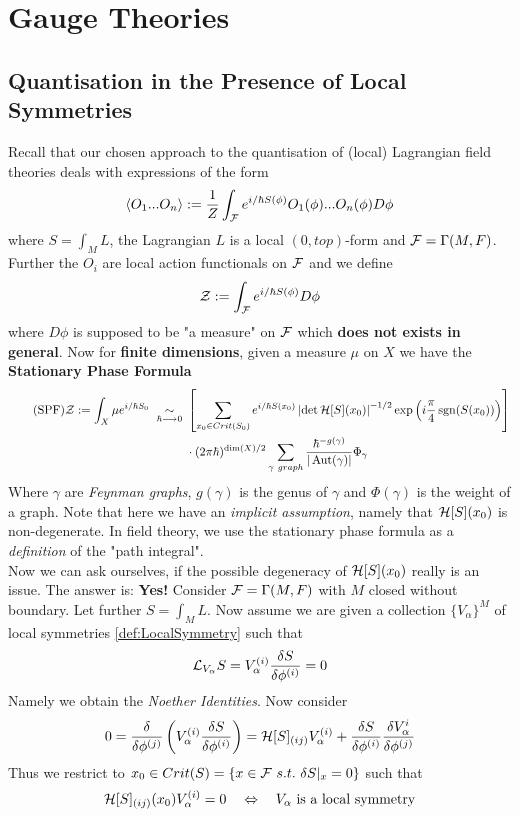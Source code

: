 \section{Gauge Theories}
\label{sec:Gauge_Theories}

\subsection{Quantisation in the Presence of Local Symmetries}

Recall that our chosen approach to the quantisation of (local) Lagrangian field theories deals with expressions of the form
$$ \langle O_1 ... O_n \rangle := \frac{1}{Z} \int_\FF e^{i/\hbar S(\phi)} O_1(\phi) ... O_n(\phi) D\phi $$
where $S = \int_M L$, the Lagrangian $L$ is a local $(0,top)$-form and ${\mathcal{F}} = \Gamma(M, F)$. Further the $O_i$ are local action functionals on ${\mathcal{F}}$ and we define
$$ \ZF := \int_\FF e^{i/\hbar S(\phi)} D\phi $$
where $D\phi$ is supposed to be "a measure" on ${\mathcal{F}}$ which \textbf{does not exists in general}. Now for \textbf{finite dimensions}, given a measure $\mu$ on $X$ we have the \textbf{Stationary Phase Formula}
\begin{align}\label{eq:StatPhase}\tag{SPF}
  \ZF := \int_X \mu e^{i/\hbar S_0} \ \underset{\hbar \lra 0}{\sim} \ &\left[ \sum_{x_0 \in Crit(S_0)} e^{i/\hbar S(x_0)} \left|\det\HH[S](x_0)\right|^{-1/2} \exp\left(i \frac{\pi}{4} \sgn(S(x_0))\right) \right]\\
   &\cdot (2\pi \hbar)^{\dim(X)/2} \sum_{\gamma \ graph} \frac{\hbar^{-g(\gamma)}}{|\Aut(\gamma)|} \Phi_\gamma
\end{align}
Where $\gamma$ are \emph{Feynman graphs}, $g(\gamma)$ is the genus of $\gamma$ and $\Phi(\gamma)$ is the weight of a graph. Note that here we have an \emph{implicit assumption}, namely that ${\mathcal{H}}[S](x_0)$ is non-degenerate. In field theory, we use the stationary phase formula as a \emph{definition} of the "path integral".\\

Now we can ask ourselves, if the possible degeneracy of ${\mathcal{H}}[S](x_0)$ really is an issue. The answer is: \textbf{Yes!} Consider ${\mathcal{F}} = \Gamma(M, F)$ with $M$ closed without boundary. Let further $S = \int_M L$. Now assume we are given a collection $\{V_\alpha\}^M$ of local symmetries \ref{def:LocalSymmetry} such that
$$ \lie{V_\alpha} S = V_\alpha^{(i)} \frac{\delta S}{\delta \phi^{(i)}} = 0 $$
Namely we obtain the \emph{Noether Identities}. Now consider
\begin{align}
  0 = \frac{\delta}{\delta \phi^{(j)}} \left( V_\alpha^{(i)} \frac{\delta S}{\delta \phi^{(i)}} \right) = \HH[S]_{(ij)} V^{(i)}_\alpha + \frac{\delta S}{\delta \phi^{(i)}} \frac{\delta V_\alpha^i}{\delta \phi^{(j)}}
\end{align}
Thus we restrict to $x_0 \in Crit(S) = \{x \in {\mathcal{F}} \ s.t. \ \delta S|_x = 0\}$ such that
$$ {\mathcal{H}}[S]_{(ij)}(x_0) V^{(i)}_\alpha = 0 \quad \Leftrightarrow \quad V_\alpha \ \text{is a local symmetry} $$

